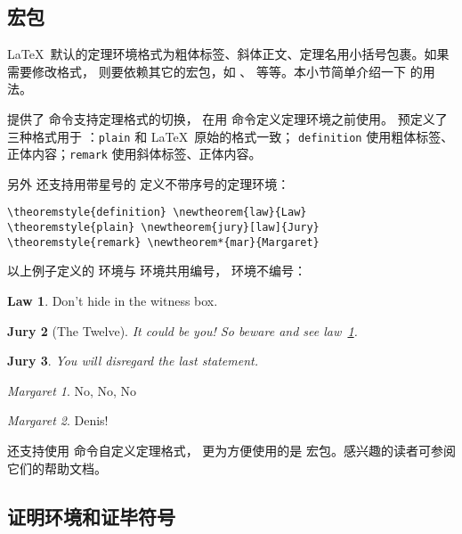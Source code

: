 \subsection{ 宏包}\label{subsec:amsthm}

\LaTeX\ 默认的定理环境格式为粗体标签、斜体正文、定理名用小括号包裹。如果需要修改格式，
则要依赖其它的宏包，如 、 等等。本小节简单介绍一下  的用法。

 提供了  命令支持定理格式的切换，
在用  命令定义定理环境之前使用。
 预定义了三种格式用于 ：\texttt{plain} 和 \LaTeX\ 原始的格式一致；
\texttt{defi\-ni\-tion} 使用粗体标签、正体内容；\texttt{remark} 使用斜体标签、正体内容。

另外  还支持用带星号的  定义不带序号的定理环境：
\begin{verbatim}
\theoremstyle{definition} \newtheorem{law}{Law}
\theoremstyle{plain} \newtheorem{jury}[law]{Jury}
\theoremstyle{remark} \newtheorem*{mar}{Margaret}
\end{verbatim}
\theoremstyle{definition} \newtheorem{law}{Law}
\theoremstyle{plain} \newtheorem{jury}[law]{Jury}
\theoremstyle{remark} \newtheorem*{mar}{Margaret}

以上例子定义的  环境与  环境共用编号， 环境不编号：
\begin{example}
\begin{law}\label{law:box}
Don't hide in the witness box.
\end{law}
\begin{jury}[The Twelve]
It could be you! So beware and
see law~\ref{law:box}.\end{jury}
\begin{jury}
You will disregard the last
statement.\end{jury}
\begin{mar}No, No, No\end{mar}
\begin{mar}Denis!\end{mar}
\end{example}

 还支持使用  命令自定义定理格式，
更为方便使用的是  宏包。感兴趣的读者可参阅它们的帮助文档。

\subsection{证明环境和证毕符号}\label{subsec:proof}

